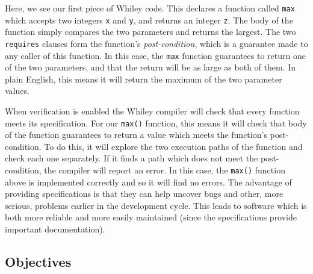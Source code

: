 Here, we see our first piece of Whiley code.  This declares a function
called \lstinline{max} which accepts two integers \lstinline{x} and
\lstinline{y}, and returns an integer \lstinline{z}.  The body of the
function simply compares the two parameters and returns the largest.
The two \lstinline{requires} clauses form the function's {\em
  post-condition}, which is a guarantee made to any caller of this
function.  In this case, the \lstinline{max} function guarantees to
return one of the two parameters, and that the return will be as large
as both of them.  In plain English, this means it will return the
maximum of the two parameter values.

When verification is enabled the Whiley compiler will check that every
function meets its specification.  For our \lstinline{max()} function,
this means it will check that body of the function guarantees to
return a value which meets the function's post-condition.  To do this,
it will explore the two execution paths of the function and check each
one separately.  If it finds a path which does not meet the
post-condition, the compiler will report an error.  In this case, the
\lstinline{max()} function above is implemented correctly and so it
will find no errors.  The advantage of providing specifications is
that they can help uncover bugs and other, more serious, problems
earlier in the development cycle.  This leads to software which is
both more reliable and more easily maintained (since the
specifications provide important documentation).

\subsection{Objectives}
